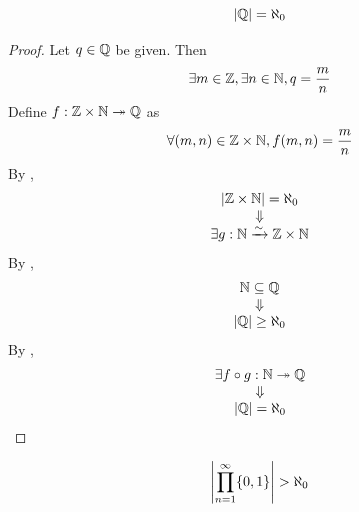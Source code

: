 \bigskip

\begin{theorem} \label{an:thm:Q-is-countable}
    \[
    \abs*{\Q} = \aleph_{0}
    \]
\end{theorem}

\begin{proof}
    Let $q \in \Q$ be given. Then
    \[
    \exists m \in \Z, \exists n \in \N, q = \frac{m}{n}
    \]
    Define $f: \Z \times \N \twoheadrightarrow \Q$ as
    \[
    \forall (m, n) \in \Z \times \N, f(m, n) = \frac{m}{n}
    \]
    By ,
    \[
    \begin{array}{c}
        \abs*{\Z \times \N} = \aleph_{0} \\
        \Downarrow \\
        \exists g: \N \xrightarrow{\sim} \Z \times \N
    \end{array}
    \]
    By ,
    \[
    \begin{array}{c}
        \N \subseteq \Q \\
        \Downarrow \\
        \abs*{\Q} \geq \aleph_{0}
    \end{array}
    \]
    By ,
    \[
    \begin{array}{c}
        \exists f \circ g: \N \twoheadrightarrow \Q \\
        \Downarrow \\
        \abs*{\Q} = \aleph_{0}
    \end{array}
    \]
\end{proof}

\bigskip

\begin{lemma} \label{an:lem:infinite-product-of-finite-sets-is-uncountable}
    \[
    \abs*{\prod_{n = 1}^{\infty} \set*{0, 1}} > \aleph_{0}
    \]
\end{lemma}

